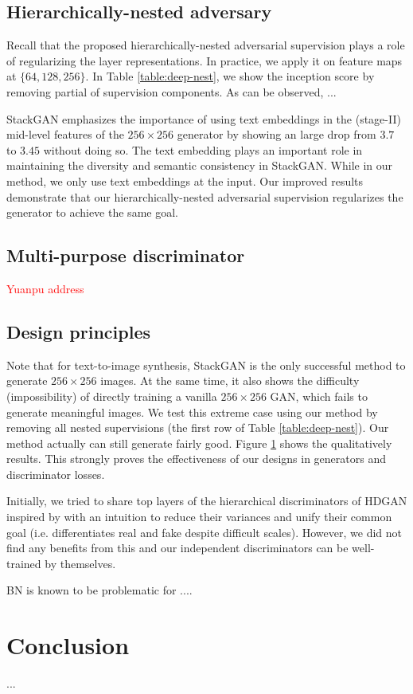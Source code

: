 \documentclass[10pt,twocolumn,letterpaper]{article}
\begin{document}
\subsection{Hierarchically-nested adversary}
Recall that the proposed hierarchically-nested adversarial supervision plays a role of regularizing the layer representations. In practice, we apply it on feature maps at $\{64, 128, 256\}$. In Table \ref{table:deep-nest}, we show the inception score by removing partial of supervision components. As can be observed, ...

StackGAN emphasizes the importance of using text embeddings in the (stage-II) mid-level features of the $256{\times}256$ generator by showing an large drop from $3.7$ to $3.45$ without doing so. The text embedding plays an important role in maintaining the diversity and semantic consistency in StackGAN. While in our method, we only use text embeddings at the input. Our improved results demonstrate that our hierarchically-nested adversarial supervision regularizes the generator to achieve the same goal. 


\subsection{Multi-purpose discriminator}
\textcolor{red}{Yuanpu address}

\begin{figure}[t]
	\centering
	\caption{} \label{fig:vallina-res}
\end{figure}


\subsection{Design principles}
Note that for text-to-image synthesis, StackGAN is the only successful method to generate $256{\times}256$ images.
At the same time, it also shows the difficulty (impossibility) of directly training a vanilla $256{\times}256$ GAN, which fails to generate meaningful images. 
We test this extreme case using our method by removing all nested supervisions (the first row of Table \ref{table:deep-nest}). 
Our method actually can still generate fairly good. Figure \ref{fig:vallina-res} shows the qualitatively results. This strongly proves the effectiveness of our designs in generators and discriminator losses.

Initially, we tried to share top layers of the hierarchical discriminators of HDGAN inspired by \cite{liu2017unsupervised} with an intuition to reduce their variances and unify their common goal (i.e. differentiates real and fake despite difficult scales). However, we did not find any benefits from this and our independent discriminators can be well-trained by themselves. 

BN is known to be problematic for .... 



\section{Conclusion}
...

{\small


}
\end{document}
